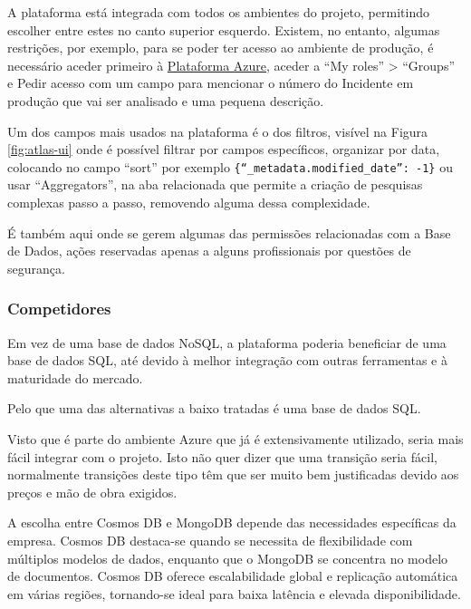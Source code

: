         A plataforma está integrada com todos os ambientes do projeto, permitindo escolher entre estes no canto superior esquerdo. Existem, no entanto, algumas restrições, por exemplo, para se poder ter acesso ao ambiente de produção, é necessário aceder primeiro à \hyperref[sec:plataforma-azure]{Plataforma Azure}, aceder a ``My roles'' > ``Groups'' e Pedir acesso com um campo para mencionar o número do Incidente em produção que vai ser analisado e uma pequena descrição.

        Um dos campos mais usados na plataforma é o dos filtros, visível na Figura \ref{fig:atlas-ui} onde é possível filtrar por campos específicos, organizar por data, colocando no campo ``sort'' por exemplo \texttt{\{``\_metadata.modified\_date'': -1\}} ou usar ``Aggregators'', na aba relacionada que permite a criação de pesquisas complexas passo a passo, removendo alguma dessa complexidade.

        É também aqui onde se gerem algumas das permissões relacionadas com a Base de Dados, ações reservadas apenas a alguns profissionais por questões de segurança. 
            
        \subsubsection{Competidores}\label{competidores-atlas}

            Em vez de uma base de dados NoSQL, a plataforma poderia beneficiar de uma base de dados SQL, até devido à melhor integração com outras ferramentas e à maturidade do mercado.

            Pelo que uma das alternativas a baixo tratadas é uma base de dados SQL.

            \label{cosmos-db}

                Visto que é parte do ambiente Azure que já é extensivamente utilizado, seria mais fácil integrar com o projeto. Isto não quer dizer que uma transição seria fácil, normalmente transições deste tipo têm que ser muito bem justificadas devido aos preços e mão de obra exigidos.

                A escolha entre Cosmos DB e MongoDB depende das necessidades específicas da empresa. Cosmos DB destaca-se quando se necessita de flexibilidade com múltiplos modelos de dados, enquanto que o MongoDB se concentra no modelo de documentos. Cosmos DB oferece escalabilidade global e replicação automática em várias regiões, tornando-se ideal para baixa latência e elevada disponibilidade\cite{cosmosdb-vs-mongodb}.

